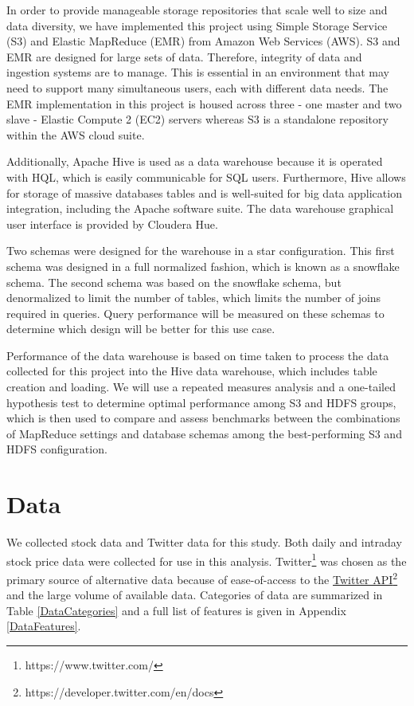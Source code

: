 \documentclass[journal]{IEEEtran}
\begin{document}
In order to provide manageable storage repositories that scale well to size and
data diversity, we have implemented this project using Simple Storage Service (S3)
and Elastic MapReduce (EMR) from Amazon Web Services (AWS). 
S3 and EMR are designed for large sets of data. 
Therefore, integrity of data and ingestion systems are to manage. 
This is essential in an environment that may need to support many simultaneous users,
each with different data needs. 
The EMR implementation in this project is housed across three 
- one master and two slave - Elastic Compute 2 (EC2) servers 
whereas S3 is a standalone repository within the AWS cloud suite.

Additionally, Apache Hive is used as a data warehouse 
because it is operated with HQL, 
which is easily communicable for SQL users. 
Furthermore, Hive allows for storage of massive databases tables and
is well-suited for big data application integration, 
including the Apache software suite. 
The data warehouse graphical user interface is provided by Cloudera Hue.

Two schemas were designed for the warehouse in a star configuration.
This first schema was designed in a full normalized fashion,
which is known as a snowflake schema.
The second schema was based on the snowflake schema, 
but denormalized to limit the number of tables, 
which limits the number of joins required in queries.
Query performance will be measured on these schemas to determine
which design will be better for this use case. 

Performance of the data warehouse is based on time taken to process the data
collected for this project into the Hive data warehouse,
which includes table creation and loading. 
We will use a repeated measures analysis and a one-tailed hypothesis 
test to determine optimal performance among S3 and HDFS groups, 
which is then used to compare and assess benchmarks between the 
combinations of MapReduce settings and database schemas among the
best-performing S3 and HDFS configuration.

\section{Data}

We collected stock data and Twitter data for this study.
Both daily and intraday stock price data were collected
 for use in this analysis. 
Twitter\footnote{https://www.twitter.com/}
 was chosen as the primary source of alternative data because of
 ease-of-access to the 
 \href{https://developer.twitter.com/en/docs}{Twitter API}\footnote{https://developer.twitter.com/en/docs}
 and the large volume of available data.
Categories of data are summarized in Table \ref{DataCategories} and a full
 list of features is given in Appendix \ref{DataFeatures}.
\end{document}
